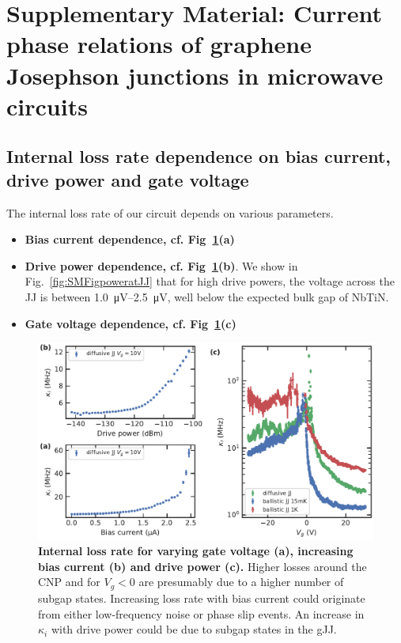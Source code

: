 

\section{Supplementary Material: Current phase relations of graphene Josephson junctions in microwave circuits}

\subsection{Internal loss rate dependence on bias current, drive power and gate voltage}\label{sec:kintib}

The internal loss rate of our circuit depends on various parameters.

\begin{itemize}
	\item \textbf{Bias current dependence, cf. Fig~\ref{fig:SMFig-lossrates}(a)}
	\item \textbf{Drive power dependence, cf. Fig~\ref{fig:SMFig-lossrates}(b)}.
	We show in Fig.~\ref{fig:SMFigpoweratJJ} that for high drive powers, the voltage across the JJ is between \SIrange{1.0}{2.5}{\micro\volt}, well below the expected bulk gap of NbTiN.
	\item \textbf{Gate voltage dependence, cf. Fig~\ref{fig:SMFig-lossrates}(c)}
\end{itemize}

\begin{figure}
	\centering
	\includegraphics[width=\linewidth]{chapter-gJJ-CPR/figs/SMFigure-lossrates}
	\caption{
		\textbf{Internal loss rate for varying gate voltage (a), increasing bias current (b) and drive power (c).}
		Higher losses around the CNP and for $V_g<0$ are presumably due to a higher number of subgap states.
		Increasing loss rate with bias current could originate from either low-frequency noise or phase slip events.
		An increase in $\kappa_i$ with drive power could be due to subgap states in the gJJ.
	}
	\label{fig:SMFig-lossrates}
\end{figure}


